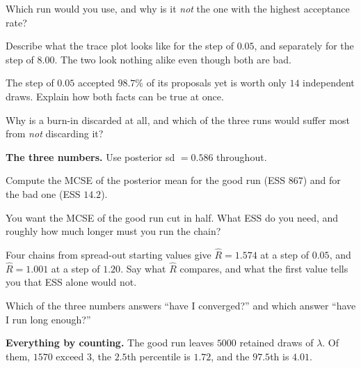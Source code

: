 \documentclass[11pt]{article}
\newcommand{\answerspace}[1]{\vspace{#1}}
\begin{document}
\begin{questions}
\begin{parts}
\item Which run would you use, and why is it \emph{not} the one with the highest acceptance rate?
\answerspace{4em}

\item Describe what the trace plot looks like for the step of $0.05$, and separately for the step of
$8.00$. The two look nothing alike even though both are bad.
\answerspace{4.5em}

\item The step of $0.05$ accepted $98.7\%$ of its proposals yet is worth only $14$ independent
draws. Explain how both facts can be true at once.
\answerspace{4em}

\item Why is a burn-in discarded at all, and which of the three runs would suffer most from
\emph{not} discarding it?
\answerspace{4em}
\end{parts}

\item \textbf{The three numbers.} Use posterior sd $= 0.586$ throughout.

\begin{parts}
\item Compute the MCSE of the posterior mean for the good run (ESS $867$) and for the bad one
(ESS $14.2$).
\answerspace{4em}

\item You want the MCSE of the good run cut in half. What ESS do you need, and roughly how much
longer must you run the chain?
\answerspace{3.5em}

\item Four chains from spread-out starting values give $\widehat{R} = 1.574$ at a step of $0.05$, and
$\widehat{R} = 1.001$ at a step of $1.20$. Say what $\widehat{R}$ compares, and what the first value
tells you that ESS alone would not.
\answerspace{4.5em}

\item Which of the three numbers answers ``have I converged?'' and which answer ``have I run long
enough?''
\answerspace{3.5em}
\end{parts}

\item \textbf{Everything by counting.} The good run leaves $5000$ retained draws of $\lambda$. Of
them, $1570$ exceed $3$, the $2.5$th percentile is $1.72$, and the $97.5$th is $4.01$.


\end{questions}
\end{document}
